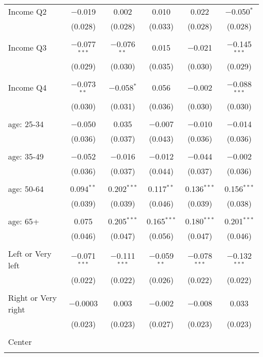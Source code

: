 \begin{tabular}{@{\extracolsep{5pt}}lccccc}
 Income Q2 & $-$0.019 & 0.002 & 0.010 & 0.022 & $-$0.050$^{*}$ \\ 
  & (0.028) & (0.028) & (0.033) & (0.028) & (0.028) \\ 
  & & & & & \\ 
 Income Q3 & $-$0.077$^{***}$ & $-$0.076$^{**}$ & 0.015 & $-$0.021 & $-$0.145$^{***}$ \\ 
  & (0.029) & (0.030) & (0.035) & (0.030) & (0.029) \\ 
  & & & & & \\ 
 Income Q4 & $-$0.073$^{**}$ & $-$0.058$^{*}$ & 0.056 & $-$0.002 & $-$0.088$^{***}$ \\ 
  & (0.030) & (0.031) & (0.036) & (0.030) & (0.030) \\ 
  & & & & & \\ 
 age: 25-34 & $-$0.050 & 0.035 & $-$0.007 & $-$0.010 & $-$0.014 \\ 
  & (0.036) & (0.037) & (0.043) & (0.036) & (0.036) \\ 
  & & & & & \\ 
 age: 35-49 & $-$0.052 & $-$0.016 & $-$0.012 & $-$0.044 & $-$0.002 \\ 
  & (0.036) & (0.037) & (0.044) & (0.037) & (0.036) \\ 
  & & & & & \\ 
 age: 50-64 & 0.094$^{**}$ & 0.202$^{***}$ & 0.117$^{**}$ & 0.136$^{***}$ & 0.156$^{***}$ \\ 
  & (0.039) & (0.039) & (0.046) & (0.039) & (0.038) \\ 
  & & & & & \\ 
 age: 65+ & 0.075 & 0.205$^{***}$ & 0.165$^{***}$ & 0.180$^{***}$ & 0.201$^{***}$ \\ 
  & (0.046) & (0.047) & (0.056) & (0.047) & (0.046) \\ 
  & & & & & \\ 
 Left or Very left & $-$0.071$^{***}$ & $-$0.111$^{***}$ & $-$0.059$^{**}$ & $-$0.078$^{***}$ & $-$0.132$^{***}$ \\ 
  & (0.022) & (0.022) & (0.026) & (0.022) & (0.022) \\ 
  & & & & & \\ 
 Right or Very right & $-$0.0003 & 0.003 & $-$0.002 & $-$0.008 & 0.033 \\ 
  & (0.023) & (0.023) & (0.027) & (0.023) & (0.023) \\ 
  & & & & & \\ 
 Center &  &  &  &  &  \\ 
  &  &  &  &  &  \\ 

\end{tabular}
